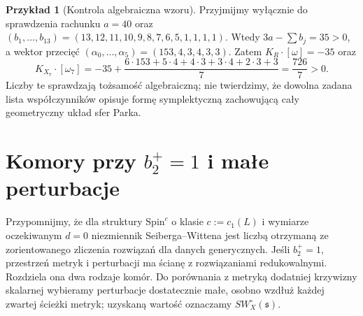 \documentclass[11pt,a4paper]{report}
\numberwithin{equation}{section}
\theoremstyle{plain}
\theoremstyle{definition}
\newtheorem{przyklad}[twierdzenie]{Przykład}
\theoremstyle{remark}
\begin{document}
\begin{przyklad}[Kontrola algebraiczna wzoru]
Przyjmijmy wyłącznie do sprawdzenia rachunku
$a=40$ oraz $(b_1,\ldots,b_{13})=(13,12,11,10,9,8,7,6,5,1,1,1,1)$.
Wtedy $3a-\sum b_j=35>0$, a wektor przecięć
$(\alpha_0,\ldots,\alpha_5)=(153,4,3,4,3,3)$.
Zatem $K_R\cdot[\omega]=-35$ oraz
\[
K_{X_7}\cdot[\omega_7]
 =-35+\frac{6\cdot153+5\cdot4+4\cdot3
                    +3\cdot4+2\cdot3+3}{7}
 =\frac{726}{7}>0.
\]
Liczby te sprawdzają tożsamość algebraiczną;
nie twierdzimy, że dowolna zadana lista współczynników
opisuje formę symplektyczną zachowującą cały geometryczny
układ sfer Parka.
\end{przyklad}

\begin{center}
\end{center}

\section{Komory przy \texorpdfstring{$b_2^+=1$}{b2+=1} i małe perturbacje}
\label{sec:tg-park14-chamber}

Przypomnijmy, że dla struktury $\mathrm{Spin}^c$ o klasie
$c:=c_1(L)$ i wymiarze oczekiwanym $d=0$ niezmiennik
Seiberga--Wittena jest liczbą otrzymaną ze zorientowanego
zliczenia rozwiązań dla danych generycznych. Jeśli $b_2^+=1$,
przestrzeń metryk i perturbacji ma ścianę z rozwiązaniami
redukowalnymi. Rozdziela ona dwa rodzaje komór.
Do porównania z metryką dodatniej krzywizny skalarnej
wybieramy perturbacje dostatecznie małe, osobno wzdłuż
każdej zwartej ścieżki metryk; uzyskaną wartość oznaczamy
$SW^{\circ}_X(\mathfrak s)$.
\end{document}
